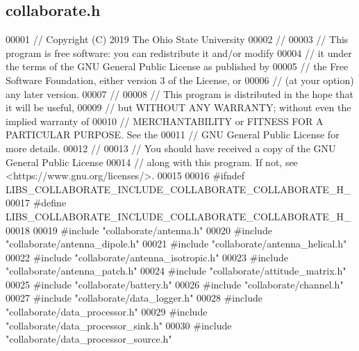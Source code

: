 \hypertarget{collaborate_8h_source}{}\subsection{collaborate.\+h}
\label{collaborate_8h_source}

\begin{DoxyCode}
00001 \textcolor{comment}{// Copyright (C) 2019 The Ohio State University}
00002 \textcolor{comment}{//}
00003 \textcolor{comment}{// This program is free software: you can redistribute it and/or modify}
00004 \textcolor{comment}{// it under the terms of the GNU General Public License as published by}
00005 \textcolor{comment}{// the Free Software Foundation, either version 3 of the License, or}
00006 \textcolor{comment}{// (at your option) any later version.}
00007 \textcolor{comment}{//}
00008 \textcolor{comment}{// This program is distributed in the hope that it will be useful,}
00009 \textcolor{comment}{// but WITHOUT ANY WARRANTY; without even the implied warranty of}
00010 \textcolor{comment}{// MERCHANTABILITY or FITNESS FOR A PARTICULAR PURPOSE.  See the}
00011 \textcolor{comment}{// GNU General Public License for more details.}
00012 \textcolor{comment}{//}
00013 \textcolor{comment}{// You should have received a copy of the GNU General Public License}
00014 \textcolor{comment}{// along with this program.  If not, see <https://www.gnu.org/licenses/>.}
00015 
00016 \textcolor{preprocessor}{#ifndef LIBS\_COLLABORATE\_INCLUDE\_COLLABORATE\_COLLABORATE\_H\_}
00017 \textcolor{preprocessor}{#define LIBS\_COLLABORATE\_INCLUDE\_COLLABORATE\_COLLABORATE\_H\_}
00018 
00019 \textcolor{preprocessor}{#include "collaborate/antenna.h"}
00020 \textcolor{preprocessor}{#include "collaborate/antenna\_dipole.h"}
00021 \textcolor{preprocessor}{#include "collaborate/antenna\_helical.h"}
00022 \textcolor{preprocessor}{#include "collaborate/antenna\_isotropic.h"}
00023 \textcolor{preprocessor}{#include "collaborate/antenna\_patch.h"}
00024 \textcolor{preprocessor}{#include "collaborate/attitude\_matrix.h"}
00025 \textcolor{preprocessor}{#include "collaborate/battery.h"}
00026 \textcolor{preprocessor}{#include "collaborate/channel.h"}
00027 \textcolor{preprocessor}{#include "collaborate/data\_logger.h"}
00028 \textcolor{preprocessor}{#include "collaborate/data\_processor.h"}
00029 \textcolor{preprocessor}{#include "collaborate/data\_processor\_sink.h"}
00030 \textcolor{preprocessor}{#include "collaborate/data\_processor\_source.h"}

\end{DoxyCode}

